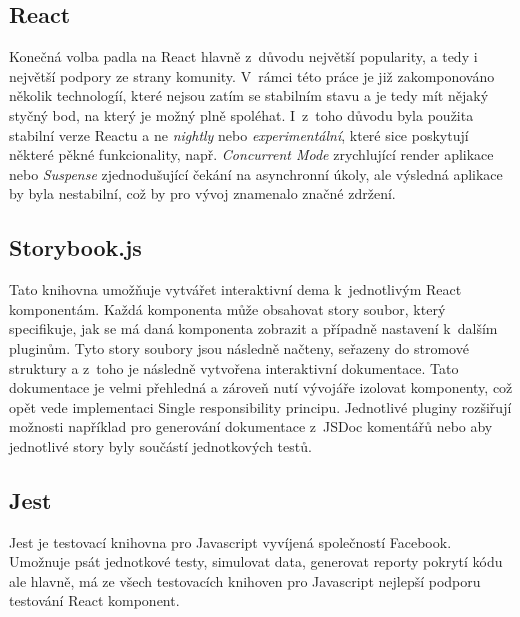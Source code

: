 \subsection{React}
\label{ss:react}
Konečná volba padla na React hlavně z~důvodu největší popularity, a tedy i největší podpory ze strany komunity. V~rámci této práce je již zakomponováno několik technologíí, které nejsou zatím se stabilním stavu a je tedy mít nějaký styčný bod, na který je možný plně spoléhat. I~z~toho důvodu byla použita stabilní verze Reactu a ne \emph{nightly} nebo \emph{experimentální}, které sice poskytují některé pěkné funkcionality, např. \emph{Concurrent Mode} zrychlující render aplikace nebo \emph{Suspense} zjednodušující čekání na asynchronní úkoly, ale výsledná aplikace by byla nestabilní, což by pro vývoj znamenalo značné zdržení.


\subsection{Storybook.js}
\label{ss:storybook}
Tato knihovna umožňuje vytvářet interaktivní dema k~jednotlivým React komponentám. Každá komponenta může obsahovat story soubor, který specifikuje, jak se má daná komponenta zobrazit a případně nastavení k~dalším pluginům. Tyto story soubory jsou následně načteny, seřazeny do stromové struktury a z~toho je následně vytvořena interaktivní dokumentace. Tato dokumentace je velmi přehledná a zároveň nutí vývojáře izolovat komponenty, což opět vede implementaci Single responsibility principu. Jednotlivé pluginy rozšiřují možnosti například pro generování dokumentace z~JSDoc komentářů nebo aby jednotlivé story byly součástí jednotkových testů.

\subsection{Jest}
\label{ss:jest}
Jest je testovací knihovna pro Javascript vyvíjená společností Facebook. Umožnuje psát jednotkové testy, simulovat data, generovat reporty pokrytí kódu ale hlavně, má ze všech testovacích knihoven pro Javascript nejlepší podporu testování React komponent.
